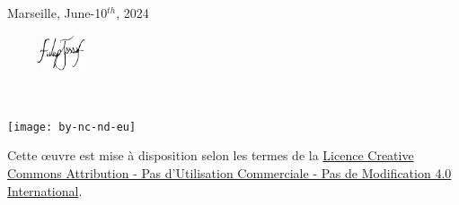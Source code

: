    Marseille, June-10$^{th}$, 2024
    
    \begin{flushright}\includegraphics[width=120px,height=40px]{tex_open/support/corrected}\end{flushright} %
\fi

~\vfill
\begin{center}
	\begin{minipage}[c]{0.25\linewidth}
		\texttt{[image: by-nc-nd-eu]}
	\end{minipage}\hfill
\end{center}

Cette \oe{}uvre est mise à disposition selon les termes de la \href{https://creativecommons.org/licenses/by-nc-nd/4.0/deed.fr}{Licence Creative Commons Attribution - Pas d’Utilisation Commerciale - Pas de Modification 4.0 International}. %
